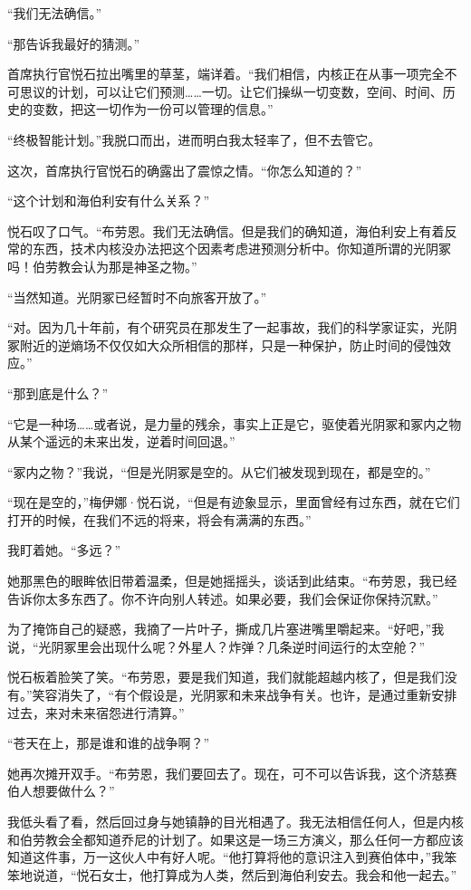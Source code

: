 \documentclass[AutoFakeBold=true]{book}
\begin{document}
``我们无法确信。''

``那告诉我最好的猜测。''

首席执行官悦石拉出嘴里的草茎，端详着。``我们相信，内核正在从事一项完全不可思议的计划，可以让它们预测……一切。让它们操纵一切变数，空间、时间、历史的变数，把这一切作为一份可以管理的信息。''

``终极智能计划。''我脱口而出，进而明白我太轻率了，但不去管它。

这次，首席执行官悦石的确露出了震惊之情。``你怎么知道的？''

``这个计划和海伯利安有什么关系？''

悦石叹了口气。``布劳恩。我们无法确信。但是我们的确知道，海伯利安上有着反常的东西，技术内核没办法把这个因素考虑进预测分析中。你知道所谓的光阴冢吗！伯劳教会认为那是神圣之物。''

``当然知道。光阴冢已经暂时不向旅客开放了。''

``对。因为几十年前，有个研究员在那发生了一起事故，我们的科学家证实，光阴冢附近的逆熵场不仅仅如大众所相信的那样，只是一种保护，防止时间的侵蚀效应。''

``那到底是什么？''

``它是一种场……或者说，是力量的残余，事实上正是它，驱使着光阴冢和冢内之物从某个遥远的未来出发，逆着时间回退。''

``冢内之物？''我说，``但是光阴冢是空的。从它们被发现到现在，都是空的。''

``现在是空的，''梅伊娜·悦石说，``但是有迹象显示，里面曾经有过东西，就在它们打开的时候，在我们不远的将来，将会有满满的东西。''

我盯着她。``多远？''

她那黑色的眼眸依旧带着温柔，但是她摇摇头，谈话到此结束。``布劳恩，我已经告诉你太多东西了。你不许向别人转述。如果必要，我们会保证你保持沉默。''

为了掩饰自己的疑惑，我摘了一片叶子，撕成几片塞进嘴里嚼起来。``好吧，''我说，``光阴冢里会出现什么呢？外星人？炸弹？几条逆时间运行的太空舱？''

悦石板着脸笑了笑。``布劳恩，要是我们知道，我们就能超越内核了，但是我们没有。''笑容消失了，``有个假设是，光阴冢和未来战争有关。也许，是通过重新安排过去，来对未来宿怨进行清算。''

``苍天在上，那是谁和谁的战争啊？''

她再次摊开双手。``布劳恩，我们要回去了。现在，可不可以告诉我，这个济慈赛伯人想要做什么？''

我低头看了看，然后回过身与她镇静的目光相遇了。我无法相信任何人，但是内核和伯劳教会全都知道乔尼的计划了。如果这是一场三方演义，那么任何一方都应该知道这件事，万一这伙人中有好人呢。``他打算将他的意识注入到赛伯体中，''我笨笨地说道，``悦石女士，他打算成为人类，然后到海伯利安去。我会和他一起去。''
\end{document}
